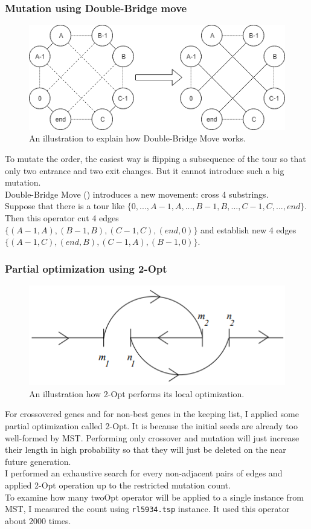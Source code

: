 \documentclass[11pt]{article}
\begin{document}
\subsubsection{Mutation using Double-Bridge move} \label{sssec:2.2.2}
\begin{figure}[htb]
	\begin{center}
		\includegraphics[width=0.6\linewidth]{DBMove.png}
	\end{center}
	\caption{An illustration to explain how Double-Bridge Move works.}
\end{figure}
To mutate the order, the easiest way is flipping a subsequence of the tour so that only two entrance and two exit changes. But it cannot introduce such a big mutation. \\
Double-Bridge Move (\cite{MOF91}) introduces a new movement: cross 4 substrings. \\
Suppose that there is a tour like $\{0, ..., A-1, A, ..., B-1, B, ..., C-1, C, ..., end\}$. Then this operator cut 4 edges $\{(A-1, A), (B-1, B), (C-1, C), (end, 0)\}$ and establish new 4 edges $\{(A-1, C), (end, B), (C-1, A), (B-1, 0)\}$. 

\subsubsection{Partial optimization using 2-Opt} \label{sssec:2.2.3}
\begin{figure}[htb]
	\begin{center}
		\includegraphics[width=0.6\linewidth]{Opt2.png}
	\end{center}
	\caption{An illustration how 2-Opt performs its local optimization.}
\end{figure}
For crossovered genes and for non-best genes in the keeping list, I applied some partial optimization called 2-Opt. It is because the initial seeds are already too well-formed by MST. Performing only crossover and mutation will just increase their length in high probability so that they will just be deleted on the near future generation. \\
I performed an exhaustive search for every non-adjacent pairs of edges and applied 2-Opt operation up to the restricted mutation count. \\
To examine how many twoOpt operator will be applied to a single instance from MST, I measured the count using \texttt{rl5934.tsp} instance. It used this operator about 2000 times.
\end{document}

